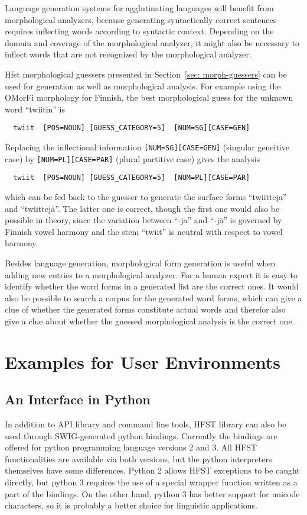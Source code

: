 \documentclass{llncs}
\begin{document}
Language generation systems for agglutinating languages will benefit
from morphological analyzers, because generating syntactically correct
sentences requires inflecting words according to syntactic
context. Depending on the domain and coverage of the morphological
analyzer, it might also be necessary to inflect words that are not
recognized by the morphological analyzer. 

Hfst morphological guessers presented in Section~\ref{sec:
  morph-guessers} can be used for generation as well as morphological
analysis. For example using the OMorFi morphology for Finnish, the
best morphological guess for the unknown word ``twiitin'' is
\begin{verbatim}
  twiit  [POS=NOUN] [GUESS_CATEGORY=5]  [NUM=SG][CASE=GEN]
\end{verbatim}
Replacing the inflectional information {\tt [NUM=SG][CASE=GEN]}
(singular geneitive case) by {\tt [NUM=PL][CASE=PAR]} (plural
partitive case) gives the analysis
\begin{verbatim}
  twiit  [POS=NOUN] [GUESS_CATEGORY=5]  [NUM=PL][CASE=PAR]
\end{verbatim}
which can be fed back to the guesser to generate the surface forms
``twiitteja'' and ``twiittejä''. The latter one is correct, though the
first one would also be possible in theory, since the variation
between ``-ja'' and ``-jä'' is governed by Finnish vowel harmony and
the stem ``twiit'' is neutral with respect to vowel harmony.

Besides language generation, morphological form generation is useful
when adding new entries to a morphological analyzer. For a human
expert it is easy to identify whether the word forms in a generated
list are the correct ones. It would also be possible to search a
corpus for the generated word forms, which can give a clue of whether
the generated forms constitute actual words and therefor also give a
clue about whether the guessed morphological analysis is the correct
one.

\section{Examples for User Environments}

\subsection{An Interface in Python}

In addition to API library and command line tools, HFST library can also be used
through SWIG-generated python bindings. Currently the bindings are offered for
python programming language versions 2 and 3. All HFST functionalities are available
via both versions, but the python interpreters themselves have some differences.
Python 2 allows HFST exceptions to be caught directly, but python 3 requires the use
of a special wrapper function written as a part of the bindings. On the other hand, 
python 3 has better support for unicode characters, so it is probably a better choice
for linguistic applications.
\end{document}
